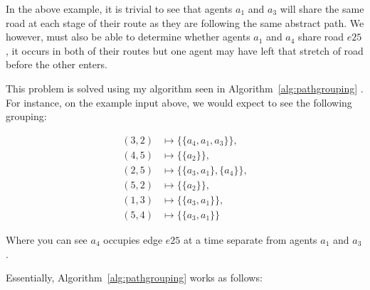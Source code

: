 In the above example, it is trivial to see that agents $a_{1}$ and $a_{3}$ will share the same road at each stage of their route as they are following the same abstract path. We however, must also be able to determine whether agents $a_{1}$ and $a_{4}$ share road $e25$, it occurs in both of their routes but one agent may have left that stretch of road before the other enters.

This problem is solved using my algorithm seen in Algorithm~\ref{alg:pathgrouping}
. For instance, on the example input above, we would expect to see the following grouping:

\begin{align*}
  (3,2) &\mapsto \{ \{ a_4,a_1,a_3 \}  \}, \\
  (4,5) &\mapsto \{ \{ a_2 \}  \}, \\
  (2,5) &\mapsto \{ \{ a_3,a_1 \}, \{ a_4 \}   \}, \\
  (5,2) &\mapsto \{ \{ a_2 \}  \} , \\
  (1,3) &\mapsto \{ \{ a_3,a_1 \}  \} , \\
  (5,4) &\mapsto \{ \{ a_3,a_1 \}  \}
\end{align*}

Where you can see $a_{4}$ occupies edge $e25$ at a time separate from agents $a_{1}$ and $a_{3}$.

Essentially, Algorithm~\ref{alg:pathgrouping} works as follows:

